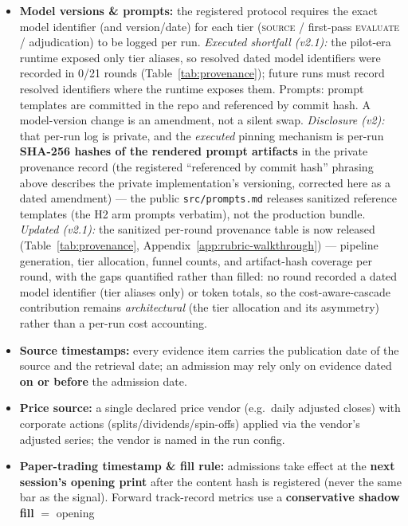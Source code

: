 \documentclass[11pt]{article}
\begin{document}
\begin{itemize}
  \item \textbf{Model versions \& prompts:} the registered protocol requires the exact model
    identifier (and version/date) for
    each tier (\textsc{source} / first-pass \textsc{evaluate} / adjudication) to be logged per
    run. \emph{Executed shortfall (v2.1):} the pilot-era runtime exposed only tier aliases, so
    resolved dated model identifiers were recorded in 0/21 rounds
    (Table~\ref{tab:provenance}); future runs must record resolved identifiers where the runtime
    exposes them. Prompts:
    prompt templates are committed in the repo and referenced by commit hash. A model-version
    change is an amendment, not a silent swap. \emph{Disclosure (v2):} that per-run log is
    private, and the \emph{executed} pinning mechanism is per-run \textbf{SHA-256 hashes of the
    rendered prompt artifacts} in the private provenance record (the registered
    ``referenced by commit hash'' phrasing above describes the private implementation's
    versioning, corrected here as a dated amendment) --- the public \texttt{src/prompts.md}
    releases sanitized reference
    templates (the H2 arm prompts verbatim), not the production bundle. \emph{Updated (v2.1):}
    the sanitized per-round provenance table is now released
    (Table~\ref{tab:provenance}, Appendix~\ref{app:rubric-walkthrough}) --- pipeline generation,
    tier allocation, funnel counts, and artifact-hash coverage per round, with the gaps quantified
    rather than filled: no round recorded a dated model identifier (tier aliases only) or token
    totals, so the cost-aware-cascade contribution
    remains \emph{architectural} (the tier allocation and its asymmetry) rather than a
    per-run cost accounting.
  \item \textbf{Source timestamps:} every evidence item carries the publication date of the
    source and the retrieval date; an admission may rely only on evidence dated \textbf{on or
    before} the admission date.
  \item \textbf{Price source:} a single declared price vendor (e.g.\ daily adjusted closes) with
    corporate actions (splits/dividends/spin-offs) applied via the vendor's adjusted series; the
    vendor is named in the run config.
  \item \textbf{Paper-trading timestamp \& fill rule:} admissions take effect at the \textbf{next
    session's opening print} after the content hash is registered (never the same bar as the
    signal). Forward track-record metrics use a \textbf{conservative shadow fill} $=$ opening

\end{itemize}
\end{document}
